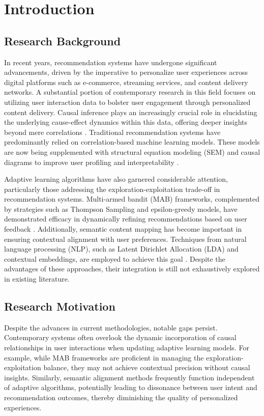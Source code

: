 \section{Introduction}

\subsection{Research Background}

In recent years, recommendation systems have undergone significant advancements, driven by the imperative to personalize user experiences across digital platforms such as e-commerce, streaming services, and content delivery networks. A substantial portion of contemporary research in this field focuses on utilizing user interaction data to bolster user engagement through personalized content delivery. Causal inference plays an increasingly crucial role in elucidating the underlying cause-effect dynamics within this data, offering deeper insights beyond mere correlations \cite{Pearl2009Causality}. Traditional recommendation systems have predominantly relied on correlation-based machine learning models. These models are now being supplemented with structural equation modeling (SEM) and causal diagrams to improve user profiling and interpretability \cite{Shmueli2010Explanatory}.

Adaptive learning algorithms have also garnered considerable attention, particularly those addressing the exploration-exploitation trade-off in recommendation systems. Multi-armed bandit (MAB) frameworks, complemented by strategies such as Thompson Sampling and epsilon-greedy models, have demonstrated efficacy in dynamically refining recommendations based on user feedback \cite{Gittins2011Multi}. Additionally, semantic content mapping has become important in ensuring contextual alignment with user preferences. Techniques from natural language processing (NLP), such as Latent Dirichlet Allocation (LDA) and contextual embeddings, are employed to achieve this goal \cite{Blei2003LDA}. Despite the advantages of these approaches, their integration is still not exhaustively explored in existing literature.

\subsection{Research Motivation}

Despite the advances in current methodologies, notable gaps persist. Contemporary systems often overlook the dynamic incorporation of causal relationships in user interactions when updating adaptive learning models. For example, while MAB frameworks are proficient in managing the exploration-exploitation balance, they may not achieve contextual precision without causal insights. Similarly, semantic alignment methods frequently function independent of adaptive algorithms, potentially leading to dissonance between user intent and recommendation outcomes, thereby diminishing the quality of personalized experiences.

